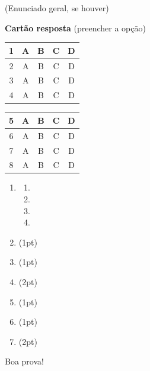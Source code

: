 \documentclass[a4paper]{article}
\begin{document}
\vspace{0.1cm}
\hrulefill
\vspace{0.3cm}

(Enunciado geral, se houver)
\vspace{0.5cm}


\begin{multicols}{2}
{\bf Cartão resposta} (preencher a opção)

\begin{tabular}[!b]{|c|c|c|c|c|}
  \hline
  1 & A & B & C & D\\
  \hline
  2 & A & B & C & D\\
  \hline
  3 & A & B & C & D\\
  \hline
  4& A & B & C & D\\
  \hline
\end{tabular}
\begin{tabular}[!b]{|c|c|c|c|c|}
  \hline
  5 & A & B & C & D\\
  \hline
  6 & A & B & C & D\\
  \hline
  7& A & B & C & D\\
  \hline
  8 & A & B & C & D\\
  \hline
\end{tabular}

\begin{enumerate}
\item 
  \begin{enumerate}
  \item
  \item
  \item
  \item 
  \end{enumerate}

\vspace{0.1cm}

\item (1pt) 

\vspace{2cm}
\item (1pt) 

\vspace{3cm}
\item (2pt) 

\vspace{4cm}
\item (1pt) 

\vspace{3cm}

\item (1pt) 

\vspace{5cm}
\item (2pt) 


\vfill
\end{enumerate}
\end{multicols}
\vfill
\begin{center}Boa prova!\end{center}
\end{document}
